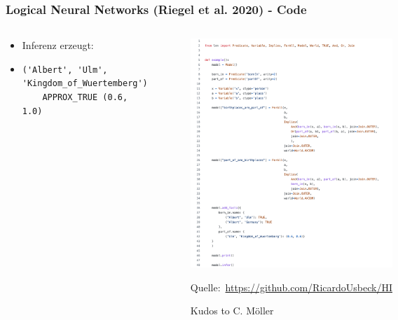 \documentclass[aspectratio=169]{beamer}
\begin{document}
\begin{frame}[fragile]\frametitle{Logical Neural Networks (Riegel et al. 2020) - Code}
    \begin{columns}
	 \begin{center}
        \begin{itemize}
            \item Inferenz erzeugt:
            \item[]
            \begin{verbatim}
('Albert', 'Ulm', 'Kingdom_of_Wuertemberg') 
    APPROX_TRUE (0.6, 1.0)
            \end{verbatim}
        \end{itemize}
    \end{center}
        \begin{figure}
        \centering
        \includegraphics[width=0.95\linewidth]{code.png}
       
        \tiny Quelle:~\url{https://github.com/RicardoUsbeck/HI} 
        
        Kudos to C. Möller
        \end{figure}
    \end{columns}
\end{frame}
\end{document}
